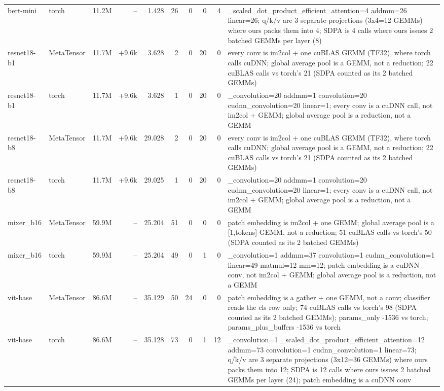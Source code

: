 \begin{tabular}{llrrrrrrrp{}}
bert-mini & torch & 11.2M & -- & 1.428 & 26 & 0 & 0 & 4 & \_scaled\_dot\_product\_efficient\_attention=4 addmm=26 linear=26; q/k/v are 3 separate projections (3x4=12 GEMMs) where ours packs them into 4; SDPA is 4 calls where ours issues 2 batched GEMMs per layer (8) \\
resnet18-b1 & MetaTensor & 11.7M & +9.6k & 3.628 & 2 & 0 & 20 & 0 & every conv is im2col + one cuBLAS GEMM (TF32), where torch calls cuDNN; global average pool is a GEMM, not a reduction; 22 cuBLAS calls vs torch's 21 (SDPA counted as its 2 batched GEMMs) \\
resnet18-b1 & torch & 11.7M & +9.6k & 3.628 & 1 & 0 & 20 & 0 & \_convolution=20 addmm=1 convolution=20 cudnn\_convolution=20 linear=1; every conv is a cuDNN call, not im2col + GEMM; global average pool is a reduction, not a GEMM \\
resnet18-b8 & MetaTensor & 11.7M & +9.6k & 29.028 & 2 & 0 & 20 & 0 & every conv is im2col + one cuBLAS GEMM (TF32), where torch calls cuDNN; global average pool is a GEMM, not a reduction; 22 cuBLAS calls vs torch's 21 (SDPA counted as its 2 batched GEMMs) \\
resnet18-b8 & torch & 11.7M & +9.6k & 29.025 & 1 & 0 & 20 & 0 & \_convolution=20 addmm=1 convolution=20 cudnn\_convolution=20 linear=1; every conv is a cuDNN call, not im2col + GEMM; global average pool is a reduction, not a GEMM \\
mixer\_b16 & MetaTensor & 59.9M & -- & 25.204 & 51 & 0 & 0 & 0 & patch embedding is im2col + one GEMM; global average pool is a [1,tokens] GEMM, not a reduction; 51 cuBLAS calls vs torch's 50 (SDPA counted as its 2 batched GEMMs) \\
mixer\_b16 & torch & 59.9M & -- & 25.204 & 49 & 0 & 1 & 0 & \_convolution=1 addmm=37 convolution=1 cudnn\_convolution=1 linear=49 matmul=12 mm=12; patch embedding is a cuDNN conv, not im2col + GEMM; global average pool is a reduction, not a GEMM \\
vit-base & MetaTensor & 86.6M & -- & 35.129 & 50 & 24 & 0 & 0 & patch embedding is a gather + one GEMM, not a conv; classifier reads the cls row only; 74 cuBLAS calls vs torch's 98 (SDPA counted as its 2 batched GEMMs); params\_only -1536 vs torch; params\_plus\_buffers -1536 vs torch \\
vit-base & torch & 86.6M & -- & 35.128 & 73 & 0 & 1 & 12 & \_convolution=1 \_scaled\_dot\_product\_efficient\_attention=12 addmm=73 convolution=1 cudnn\_convolution=1 linear=73; q/k/v are 3 separate projections (3x12=36 GEMMs) where ours packs them into 12; SDPA is 12 calls where ours issues 2 batched GEMMs per layer (24); patch embedding is a cuDNN conv \\

\end{tabular}
